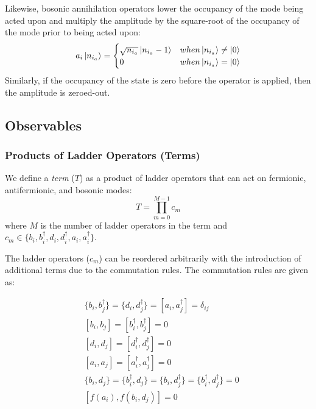 Likewise, bosonic annihilation operators lower the occupancy of the mode being acted upon and multiply the amplitude by the square-root of the occupancy of the mode prior to being acted upon:
\begin{equation}
    \label{eq:bosonic-annihilation}
    a_i \ket{n_{i_a}} = 
    \begin{cases} 
        \sqrt{n_{i_a}} \ket{n_{i_a} - 1}  & when \ket{n_{i_a}} \neq \ket{0} \\
        0 & when \ket{n_{i_a}} = \ket{0}
    \end{cases}
\end{equation}
Similarly, if the occupancy of the state is zero before the operator is applied, then the amplitude is zeroed-out.

\subsection{Observables}
\label{subsec:observables}

\subsubsection{Products of Ladder Operators (Terms)}

We define a \textit{term} ($T$) as a product of ladder operators that can act on fermionic, antifermionic, and bosonic modes:
\begin{equation}
    \label{eq:term}
    T = \prod_{m=0}^{M-1} c_m
\end{equation}
where $M$ is the number of ladder operators in the term and $c_m \in \{b_i, b_i^\dagger, d_i, d_i^\dagger, a_i, a_i^\dagger\}$.

The ladder operators ($c_m$) can be reordered arbitrarily with the introduction of additional terms due to the commutation rules.
The commutation rules are given as:

\begin{equation}
    \label{eq:commutation}
    \begin{split}
        &\{b_i, b_j^\dagger\} = \{d_i, d_j^\dagger\} = [a_i, a_j^\dagger] = \delta_{ij}\\
        & [b_i, b_j] = [b_i^\dagger, b_j^\dagger] = 0 \\
        & [d_i, d_j] = [d_i^\dagger, d_j^\dagger] = 0 \\
        & [a_i, a_j] = [a_i^\dagger, a_j^\dagger] = 0 \\
        & \{b_i, d_j\} = \{b_i^\dagger, d_j\} = \{b_i, d_j^\dagger\} = \{b_i^\dagger, d_j^\dagger\} = 0\\
        & [f(a_i), f(b_i, d_j)] = 0
    \end{split}
\end{equation}

